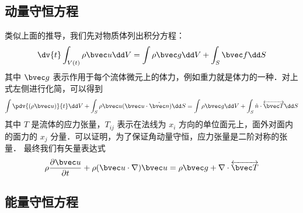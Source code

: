 \subsection{动量守恒方程}
类似上面的推导，我们先对物质体列出积分方程：
\begin{equation}
\dv{t}\int_{V(t)} \rho \bvec u \dd V=\int \rho \bvec g\dd V+\int_S \bvec f\dd S
\end{equation}
其中 $\bvec g$ 表示作用于每个流体微元上的体力，例如重力就是体力的一种．对上式左侧进行化简，可以得到
\begin{equation}
\int \pdv{(\rho \bvec u)}{t}\dd V+\int_S\rho \bvec u (\bvec u\cdot \hat{\bvec n})\dd S=\int \rho\bvec g\dd V+\int_S \hat n\cdot \overleftrightarrow {\bvec T}\dd S
\end{equation}
其中 $T$ 是流体的应力张量，$T_{ij}$ 表示在法线为 $x_i$ 方向的单位面元上，面外对面内的面力的 $x_j$ 分量．可以证明，为了保证角动量守恒，应力张量是二阶对称的张量．
最终我们有矢量表达式
\begin{equation}
\rho \frac{\partial \bvec u}{\partial t}+\rho(\bvec u\cdot \nabla)\bvec u=\rho \bvec g+\nabla\cdot \overleftrightarrow {\bvec T}
\end{equation}
\subsection{能量守恒方程}
